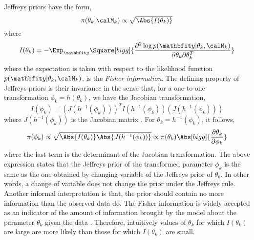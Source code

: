 Jeffreys priors \cite{Jeffreys:1946jf} have the form,
\begin{equation}
  \pi(\theta_k|\calM_k)\propto\sqrt{\Abs{I(\theta_k)}}
\end{equation}
where
\begin{equation}
  I(\theta_k)
  = -\Exp_{\data}\Square[bigg]{\frac{\partial^2\log p(\data|\theta_k,\calM_k)}
    {\partial\theta_k\partial\theta_k^T}}
\end{equation}
where the expectation is taken with respect to the likelihood function $p(\data|\theta_k,\calM_k)$, is the \emph{Fisher information}. The defining property of Jeffreys priors is their invariance in the sense that, for a one-to-one transformation $\phi_k = h(\theta_k)$, we have the Jacobian transformation,
\begin{equation*}
  I(\phi_k) = (J(h^{-1}(\phi_k)))^T I(h^{-1}(\phi_k)) 
  (J(h^{-1}(\phi_k)))
\end{equation*}
where $J(h^{-1}(\phi_k))$ is the Jacobian matrix . For $\theta_k =
h^{-1}(\phi_k)$, it follows,
\begin{equation*}
  \pi(\phi_k)
  \propto \sqrt{\Abs{I(\theta_k)}\Abs{J(h^{-1}(\phi_k))}}
  \propto \pi(\theta_k)
  \Abs[bigg]{\frac{\partial\theta_k}{\partial\phi_k}}
\end{equation*}
where the last term is the determinant of the Jacobian transformation. The above expression states that the Jeffreys prior of the transformed parameter $\phi_k$ is the same as the one obtained by changing variable of the Jeffreys prior of $\theta_k$. In other words, a change of variable does not change the prior under the Jeffreys rule. Another informal interpretation is that, the prior should contain no more information than the observed data do. The Fisher information is widely accepted as an indicator of the amount of information brought by the model about the parameter $\theta_k$ given the data \cite{Fisher:1956vx}. Therefore, intuitively values of $\theta_k$ for which $I(\theta_k)$ are large are more likely than those for which $I(\theta_k)$ are small.


